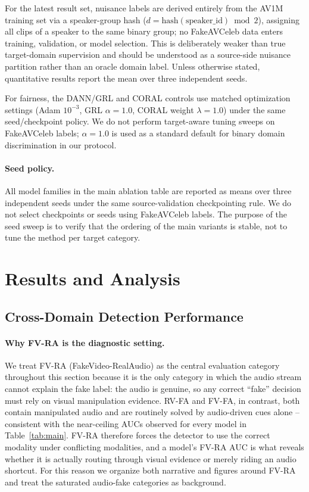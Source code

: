 \documentclass{article}
\begin{document}
For the latest result set, nuisance labels are derived entirely from the AV1M training set via a speaker-group hash ($d = \mathrm{hash}(\mathrm{speaker\_id})\bmod 2$), assigning all clips of a speaker to the same binary group; no FakeAVCeleb data enters training, validation, or model selection. This is deliberately weaker than true target-domain supervision and should be understood as a source-side nuisance partition rather than an oracle domain label. Unless otherwise stated, quantitative results report the mean over three independent seeds.

For fairness, the DANN/GRL and CORAL controls use matched optimization settings (Adam $10^{-3}$, GRL $\alpha{=}1.0$, CORAL weight $\lambda{=}1.0$) under the same seed/checkpoint policy. We do not perform target-aware tuning sweeps on FakeAVCeleb labels; $\alpha{=}1.0$ is used as a standard default for binary domain discrimination in our protocol.

\paragraph{Seed policy.}
All model families in the main ablation table are reported as means over three independent seeds under the same source-validation checkpointing rule. We do not select checkpoints or seeds using FakeAVCeleb labels. The purpose of the seed sweep is to verify that the ordering of the main variants is stable, not to tune the method per target category.

\section{Results and Analysis}

\subsection{Cross-Domain Detection Performance}

\paragraph{Why FV-RA is the diagnostic setting.}
We treat FV-RA (FakeVideo-RealAudio) as the central evaluation category throughout this section because it is the only category in which the audio stream cannot explain the fake label: the audio is genuine, so any correct ``fake'' decision must rely on visual manipulation evidence. RV-FA and FV-FA, in contrast, both contain manipulated audio and are routinely solved by audio-driven cues alone -- consistent with the near-ceiling AUCs observed for every model in Table~\ref{tab:main}. FV-RA therefore forces the detector to use the correct modality under conflicting modalities, and a model's FV-RA AUC is what reveals whether it is actually routing through visual evidence or merely riding an audio shortcut. For this reason we organize both narrative and figures around FV-RA and treat the saturated audio-fake categories as background.
\end{document}
